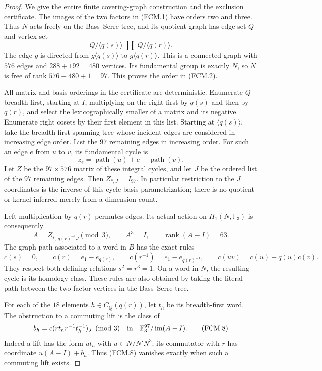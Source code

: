 \begin{proof}
We give the entire finite covering-graph construction and the
exclusion certificate.  The images of the two factors in (FCM.1)
have orders two and three.  Thus $N$ acts freely on the
Bass--Serre tree, and its quotient graph has edge set $Q$ and
vertex set
\[
 Q/\langle q(s)\rangle\ \amalg\ Q/\langle q(r)\rangle.
\]
The edge $g$ is directed from $g\langle q(s)\rangle$ to
$g\langle q(r)\rangle$.  This is a connected graph with $576$
edges and $288+192=480$ vertices.  Its fundamental group is
exactly $N$, so $N$ is free of rank $576-480+1=97$.
This proves the order in (FCM.2).

All matrix and basis orderings in the certificate are deterministic.
Enumerate $Q$ breadth first, starting at $I$, multiplying on the
right first by $q(s)$ and then by $q(r)$, and select the
lexicographically smaller of a matrix and its negative.  Enumerate
right cosets by their first element in this list.  Starting at
$\langle q(s)\rangle$, take the breadth-first spanning tree whose
incident edges are considered in increasing edge order.  List the
$97$ remaining edges in increasing order.  For such an edge $e$
from $u$ to $v$, its fundamental cycle is
\[
 z_e=\operatorname{path}(u)+e-\operatorname{path}(v).
\]
Let $Z$ be the $97\times576$ matrix of these integral cycles, and
let $J$ be the ordered list of the $97$ remaining edges.  Then
$Z_{*,J}=I_{97}$.  In particular restriction to the $J$ coordinates
is the inverse of this cycle-basis parametrization; there is no
quotient or kernel inferred merely from a dimension count.

Left multiplication by $q(r)$ permutes edges.  Its actual action
on $H_1(N,\mathbb F_3)$ is consequently
\[
 A=Z_{*,\,q(r)^{-1}J}\pmod3,
 \qquad A^3=I,
 \qquad \operatorname{rank}(A-I)=63.                    \tag{FCM.6}
\]
The graph path associated to a word in $B$ has the exact rules
\[
 c(s)=0,\qquad c(r)=e_1-e_{q(r)},\qquad
 c(r^{-1})=e_1-e_{q(r)^{-1}},\qquad
 c(uv)=c(u)+q(u)c(v).                                   \tag{FCM.7}
\]
They respect both defining relations $s^2=r^3=1$.  On a word in
$N$, the resulting cycle is its homology class.  These rules are
also obtained by taking the literal path between the two factor
vertices in the Bass--Serre tree.

For each of the $18$ elements $h\in C_Q(q(r))$, let $t_h$ be its
breadth-first word.  The obstruction to a commuting lift is the
class of
\[
 b_h=c(r t_h r^{-1}t_h^{-1})_{J}\pmod3
 \quad\hbox{in}\quad
 \mathbb F_3^{97}/\operatorname{im}(A-I).                \tag{FCM.8}
\]
Indeed a lift has the form $u t_h$ with $u\in N/N'N^3$; its
commutator with $r$ has coordinate $u(A-I)+b_h$.
Thus (FCM.8) vanishes exactly when such a commuting lift exists.


\end{proof}
